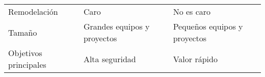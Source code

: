 \begin{longtable}{|p{5cm}|p{5cm}|p{5cm}|}
    Remodelación                                   & Caro                                                                                                                               & No es caro                                                                                                                                                                                          \\
    Tamaño                                         & Grandes equipos y proyectos                                                                                                        & Pequeños equipos y proyectos                                                                                                                                                                        \\
    Objetivos principales                          & Alta seguridad                                                                                                                     & Valor rápido
\end{longtable}